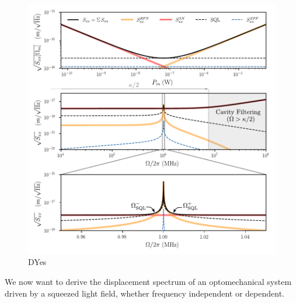 \begin{figure}
  \centering
  \includegraphics[width=\textwidth]{./chap3/fig/SQL0.pdf}
  \caption{DYes}
  \label{fig:freq_indep_squeezing}
\end{figure}

We now want to derive the displacement spectrum of an optomechanical system driven by a squeezed light field, whether frequency independent or dependent. 

